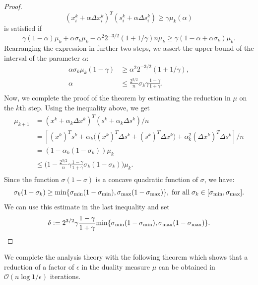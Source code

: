 \documentclass[a4paper,10 pt,titlepage,twoside]{report}
\theoremstyle{plain}
\theoremstyle{definition}
\theoremstyle{remark}
\begin{document}
\begin{proof}
\begin{equation*}
		(x_{i}^{k} + \alpha\Delta x_{i}^{k})^{T}(s_{i}^{k} + \alpha\Delta s_{i}^{k}) \geq \gamma\mu_{k}(\alpha)
	\end{equation*} is satisfied if \begin{equation*}
	\gamma(1-\alpha)\mu_{k} + \alpha\sigma_{k}\mu_{k} - \alpha^{2}2^{-3/2}(1 + 1/\gamma)n\mu_{k}\geq \gamma(1 - \alpha +\alpha\sigma_{k})\mu_{k}.
	\end{equation*}
	Rearranging the expression in further two steps, we assert the upper bound of the interval of the parameter $\alpha$:
	\begin{align*}
	\alpha\sigma_{k}\mu_{k}(1-\gamma)&\geq\alpha^{2}2^{-3/2}(1+1/\gamma),\\
	\alpha&\leq \frac{2^{3/2}}{n} \sigma_{k}\gamma\frac{1-\gamma}{1+\gamma}.\\		
	\end{align*}
	Now, we complete the proof of the theorem by estimating the reduction in $\mu$ on the $k$th step. Using the inequality above, we get
	\begin{align*}
	\mu_{k+1}& = (x^{k} + \alpha_{k}\Delta x^{k})^{T}(s^{k} + \alpha_{k}\Delta s^{k})/n\\
	& = [(x^{k})^{T}s^{k} + \alpha_{k}\big((x^{k})^{T}\Delta s^{k} + (s^{k})^{T}\Delta x^{k}\big) +\alpha^{2}_{k}(\Delta x^{k})^{T}\Delta s^{k}]/n\\
	& = (1 - \alpha_{k}(1-\sigma_{k}))\mu_{k}\\
	& \leq \Big(1 - \frac{2^{3/2}}{n}\gamma\frac{1-\gamma}{1+\gamma}\sigma_{k}(1-\sigma_{k})\Big)\mu_{k}.\\
	\end{align*}
	Since the function $\sigma(1 - \sigma)$ is a concave quadratic function of $\sigma$, we have:
	\begin{equation*}
	\sigma_{k}(1-\sigma_{k})\geq \text{min}\{\sigma_{\text{min}}(1-\sigma_{\text{min}}),\sigma_{\text{max}}(1-\sigma_{\text{max}})\}, \text{\;for all\;}\sigma_{k}\in[\sigma_{\text{min}},\sigma_{\text{max}}].
	\end{equation*}
	We can use this estimate in the last inequality and set
	\begin{equation*}
	\delta \vcentcolon=2^{3/2}\gamma\frac{1-\gamma}{1+\gamma}\text{\text{min}}\{\sigma_{\text{min}}(1-\sigma_{\text{min}}),\sigma_{\text{max}}(1-\sigma_{\text{max}})\}.
	\end{equation*}
\end{proof}
We complete the analysis theory with the following theorem which shows that a reduction of a factor of $\epsilon$ in the duality measure $\mu$ can be obtained in $\mathcal{O}(n\log{1/\epsilon})$ iterations.
\end{document}
